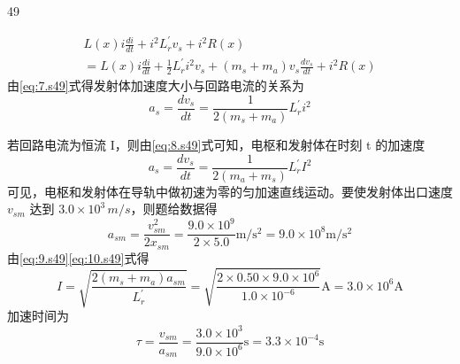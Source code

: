 \begin{solution}{49}
\begin{subsolution}
\begin{equation}
\begin{array}{c}
L(x)i\frac{di}{dt} + i^{2}L_{r}^{\prime}v_{s} + i^{2}R(x) \\
= L(x)i\frac{di}{dt} + \frac{1}{2}L_{r}^{\prime}i^{2}v_{s} + (m_{s}+m_{a})v_{s}\frac{dv_{s}}{dt} + i^{2}R(x)
\end{array}
\label{eq:7.s49}
\end{equation}
由\eqref{eq:7.s49}式得发射体加速度大小与回路电流的关系为
\begin{equation}
a_{s} = \frac{dv_{s}}{dt} = \frac{1}{2(m_{s}+m_{a})}L_{r}^{\prime}i^{2}
\label{eq:8.s49}
\end{equation}
\end{subsolution}
\begin{subsolution}
若回路电流为恒流 I，则由\eqref{eq:8.s49}式可知，电枢和发射体在时刻 t 的加速度
\begin{equation}
a_{s} = \frac{dv_{s}}{dt} = \frac{1}{2(m_{a}+m_{s})}L_{r}^{\prime}I^{2}
\label{eq:9.s49}
\end{equation}
可见，电枢和发射体在导轨中做初速为零的匀加速直线运动。要使发射体出口速度 $v_{sm}$ 达到 $3.0 \times 10^{3} \, m/s$，则题给数据得
\begin{equation}
a_{sm} = \frac{v_{sm}^{2}}{2x_{sm}} = \frac{9.0 \times 10^{9}}{2 \times 5.0} \mathrm{m}/\mathrm{s}^{2} = 9.0 \times 10^{8} \mathrm{m}/\mathrm{s}^{2}
\label{eq:10.s49}
\end{equation}
由\eqref{eq:9.s49}\eqref{eq:10.s49}式得
\begin{equation}
I = \sqrt{\frac{2(m_{s}+m_{a})a_{sm}}{L_{r}^{\prime}}} = \sqrt{\frac{2 \times 0.50 \times 9.0 \times 10^{6}}{1.0 \times 10^{-6}}} \mathrm{A} = 3.0 \times 10^{6} \mathrm{A}
\label{eq:11.s49}
\end{equation}
加速时间为
\begin{equation}
\tau = \frac{v_{sm}}{a_{sm}} = \frac{3.0 \times 10^{3}}{9.0 \times 10^{6}} \mathrm{s} = 3.3 \times 10^{-4} \mathrm{s}
\label{eq:12.s49}
\end{equation}
\end{subsolution}
\end{solution}